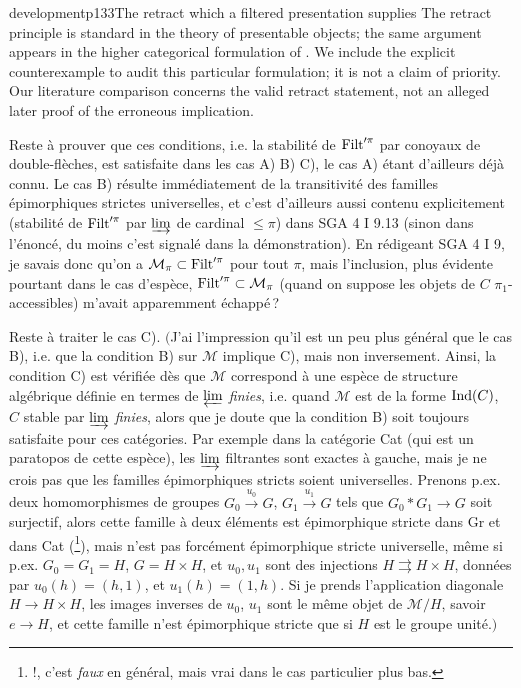\begin{dcomment}{development}{p133}{The retract which a filtered presentation supplies}
The retract principle is standard in the theory of presentable objects; the same argument appears in the higher categorical formulation of \citet[Lemma~5.4.2.4]{Lurie2009HTT}. We include the explicit counterexample to audit this particular formulation; it is not a claim of priority. Our literature comparison concerns the valid retract statement, not an alleged later proof of the erroneous implication.
\end{dcomment}


Reste à prouver que ces conditions, i.e. la stabilité de $\mathrm{Filt}'^{\pi}$ par conoyaux de double-flèches, est satisfaite dans les cas A) B) C), le cas A) étant d'ailleurs déjà connu. Le cas B) résulte immédiatement de la transitivité des familles épimorphiques strictes universelles, et c'est d'ailleurs aussi contenu explicitement (stabilité de $\mathrm{Filt}'^{\pi}$ par $\varinjlim$ de cardinal $\leqslant \pi$) dans SGA 4 I 9.13 (sinon dans l'énoncé, du moins c'est signalé dans la démonstration). En rédigeant SGA 4 I 9, je savais donc qu'on a $\mathcal{M}_{\pi} \subset \mathrm{Filt}'^{\pi}$ pour tout $\pi$, mais l'inclusion, plus évidente pourtant dans le cas d'espèce, $\mathrm{Filt}'^{\pi} \subset \mathcal{M}_{\pi}$ (quand on suppose les objets de $C$ $\pi_1$-accessibles) m'avait apparemment échappé\,?

Reste à traiter le cas C). $\Big($J'ai l'impression qu'il est un peu plus général que le cas B), i.e. que la condition B) sur $\mathcal{M}$ implique C), mais non inversement. Ainsi, la condition C) est vérifiée dès que $\mathcal{M}$ correspond à une espèce de structure algébrique définie en
termes de $\varprojlim$ \textit{finies}, i.e. quand $\mathcal{M}$ est de la forme $\operatorname{Ind}(C)$, $C$ stable par $\varinjlim$ \textit{finies}, alors que je doute que la condition B) soit toujours satisfaite pour ces catégories. Par exemple dans la catégorie Cat (qui est un paratopos de cette espèce), les $\varinjlim$ filtrantes sont exactes à gauche, mais je ne crois pas que les familles épimorphiques stricts soient universelles. %
Prenons p.ex. deux homomorphismes de groupes $G_0 \xrightarrow{u_0} G$, $G_1 \xrightarrow{u_1} G$ tels que $G_0 * G_1 \longrightarrow G$ soit surjectif, alors cette famille à deux éléments est épimorphique stricte dans Gr et dans Cat (\footnote{!, c'est \textit{faux} en général, mais vrai dans le cas particulier plus bas.}), mais n'est pas forcément épimorphique stricte universelle, même si p.ex. $G_0 = G_1 = H$, $G = H \times H$, et $u_0, u_1$ sont des injections $H \rightrightarrows H \times H$, données par $u_0(h) = (h,1)$, et $u_1(h) = (1,h)$. Si je prends l'application diagonale $H \longrightarrow H \times H$, les images inverses de $u_0$, $u_1$ sont le même objet de $\mathcal{M}/H$, savoir $e \longrightarrow H$, et cette famille n'est épimorphique stricte que si $H$ est le groupe unité.$\Big)$

